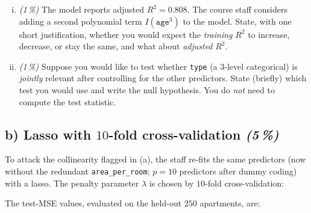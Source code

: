 \documentclass[11pt,a4paper]{article}
\newcommand{\subpoints}[1]{\textit{(#1\,\%)}}
\begin{document}
\begin{enumerate}[(i)]
  \item \subpoints{1} The model reports adjusted $R^2 = 0.808$. The course staff considers adding a second polynomial term $I(\texttt{age}^3)$ to the model. State, with one short justification, whether you would expect the \emph{training} $R^2$ to increase, decrease, or stay the same, and what about \emph{adjusted} $R^2$.
  \item \subpoints{1} Suppose you would like to test whether \texttt{type} (a $3$-level categorical) is \emph{jointly} relevant after controlling for the other predictors. State (briefly) which test you would use and write the null hypothesis. You do \emph{not} need to compute the test statistic.
\end{enumerate}

\subsection*{b) Lasso with $10$-fold cross-validation \subpoints{5}}

To attack the collinearity flagged in (a), the staff re-fits the same predictors (now without the redundant \texttt{area\_per\_room}; $p = 10$ predictors after dummy coding) with a lasso. The penalty parameter $\lambda$ is chosen by $10$-fold cross-validation:

\begin{center}
\end{center}

\noindent The test-MSE values, evaluated on the held-out $250$ apartments, are:
\end{document}
